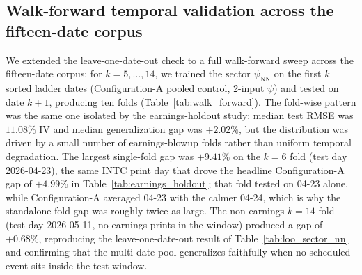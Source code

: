 \subsection{Walk-forward temporal validation across the fifteen-date corpus}\label{sec:supp_walk_forward}

We extended the leave-one-date-out check to a full walk-forward sweep across the fifteen-date corpus: for $k = 5,\ldots,14$, we trained the sector $\psi_{\text{NN}}$ on the first $k$ sorted ladder dates (Configuration-A pooled control, 2-input $\psi$) and tested on date $k+1$, producing ten folds (Table~\ref{tab:walk_forward}). The fold-wise pattern was the same one isolated by the earnings-holdout study: median test RMSE was $11.08\%$ IV and median generalization gap was $+2.02\%$, but the distribution was driven by a small number of earnings-blowup folds rather than uniform temporal degradation. The largest single-fold gap was $+9.41\%$ on the $k = 6$ fold (test day 2026-04-23), the same INTC print day that drove the headline Configuration-A gap of $+4.99\%$ in Table~\ref{tab:earnings_holdout}; that fold tested on 04-23 alone, while Configuration-A averaged 04-23 with the calmer 04-24, which is why the standalone fold gap was roughly twice as large. The non-earnings $k = 14$ fold (test day 2026-05-11, no earnings prints in the window) produced a gap of $+0.68\%$, reproducing the leave-one-date-out result of Table~\ref{tab:loo_sector_nn} and confirming that the multi-date pool generalizes faithfully when no scheduled event sits inside the test window.

